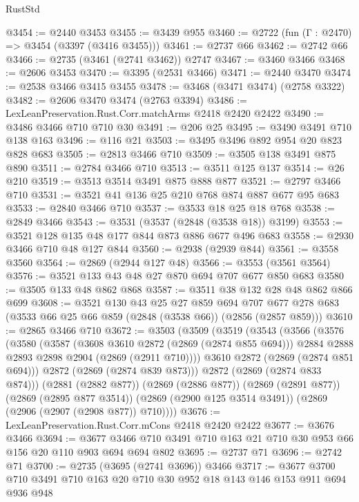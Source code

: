 \begin{lexlean}{RustStd}
\begin{coremodule}
{\begin{coremodule}
{{{{{{{{{{{{@3454 := @2440 @3453
@3455 := @3439 @955
@3460 := @2722 (fun (Γ : @2470) => @3454 (@3397 (@3416 @3455)))
@3461 := @2737 @66
@3462 := @2742 @66
@3466 := @2735 (@3461 (@2741 @3462)) @2747
@3467 := @3460 @3466
@3468 := @2606 @3453
@3470 := @3395 (@2531 @3466)
@3471 := @2440 @3470
@3474 := @2538 @3466 @3415 @3455
@3478 := @3468 (@3471 @3474) (@2758 @3322)
@3482 := @2606 @3470 @3474 (@2763 @3394)
@3486 := LexLeanPreservation.Rust.Corr.matchArms @2418 @2420 @2422
@3490 := @3486 @3466 @710 @710 @30
@3491 := @206 @25
@3495 := @3490 @3491 @710 @138 @163
@3496 := @116 @21
@3503 := @3495 @3496 @892 @954 @20 @823 @828 @683
@3505 := @2813 @3466 @710
@3509 := @3505 @138 @3491 @875 @890
@3511 := @2784 @3466 @710
@3513 := @3511 @125 @137
@3514 := @26 @210
@3519 := @3513 @3514 @3491 @875 @888 @877
@3521 := @2797 @3466 @710
@3531 := @3521 @41 @136 @25 @210 @768 @874 @887 @677 @95 @683
@3533 := @2840 @3466 @710
@3537 := @3533 @18 @25 @18 @768
@3538 := @2849 @3466
@3543 := @3531 (@3537 (@2848 (@3538 @18)) @3199)
@3553 := @3521 @128 @135 @48 @177 @844 @873 @886 @677 @496 @683
@3558 := @2930 @3466 @710 @48 @127 @844
@3560 := @2938 (@2939 @844)
@3561 := @3558 @3560
@3564 := @2869 (@2944 @127 @48)
@3566 := @3553 (@3561 @3564)
@3576 := @3521 @133 @43 @48 @27 @870 @694 @707 @677 @850 @683
@3580 := @3505 @133 @48 @862 @868
@3587 := @3511 @38 @132 @28 @48 @862 @866 @699
@3608 := @3521
    @130
    @43
    @25
    @27
    @859
    @694
    @707
    @677
    @278
    @683
    (@3533 @66 @25 @66 @859 (@2848 (@3538 @66)) (@2856 (@2857 @859)))
@3610 := @2865 @3466 @710
@3672 := @3503
    (@3509
      (@3519
        (@3543
          (@3566
            (@3576
              (@3580
                (@3587
                  (@3608 @3610 @2872 (@2869 (@2874 @855 @694)))
                  @2884
                  @2888
                  @2893
                  @2898
                  @2904
                  (@2869 (@2911 @710))))
              @3610
              @2872
              (@2869 (@2874 @851 @694)))
            @2872
            (@2869 (@2874 @839 @873)))
          @2872
          (@2869 (@2874 @833 @874)))
        (@2881 (@2882 @877))
        (@2869 (@2886 @877))
        (@2869 (@2891 @877))
        (@2869 (@2895 @877 @3514))
        (@2869 (@2900 @125 @3514 @3491))
        (@2869 (@2906 (@2907 (@2908 @877)) @710))))
@3676 := LexLeanPreservation.Rust.Corr.mCons @2418 @2420 @2422
@3677 := @3676 @3466
@3694 := @3677 @3466 @710 @3491 @710 @163 @21 @710 @30 @953 @66 @156 @20 @110 @903 @694 @694 @802
@3695 := @2737 @71
@3696 := @2742 @71
@3700 := @2735 (@3695 (@2741 @3696)) @3466
@3717 := @3677 @3700 @710 @3491 @710 @163 @20 @710 @30 @952 @18 @143 @146 @153 @911 @694 @936 @948
}}}}}}}}}}}}
\end{coremodule}}
\end{coremodule}
\end{lexlean}
